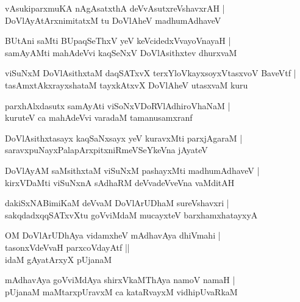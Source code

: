 \documentclass[twoside,12pt,openright]{book}
\newcounter{shloka}[chapter]
\begin{document}
\begin{shloka}%
vAsukiparxmuKA nAgAsatxthA deVvAsutxreVshavxrAH |\\
DoVlAyAtArxnimitatxM tu DoVlAheV madhumAdhaveV 
\end{shloka}

\begin{shloka}%
BUtAni saMti BUpaqSeThxV yeV keVcidedxVvayoVnayaH |\\
samAyAMti mahAdeVvi kaqSeNxV DoVlAsithxtev dhurxvaM 
\end{shloka}

\begin{shloka}%
viSuNxM DoVlAsithxtaM daqSATxvX terxYloVkayxsoyxVtasxvoV BaveVtf |\\
tasAmxtAkxrayxshataM tayxkAtxvX DoVlAheV utasxvaM kuru
\end{shloka}

\begin{shloka}%
parxhAlxdasutx samAyAti viSoNxVDoRVlAdhiroVhaNaM |\\
kuruteV ca mahAdeVvi varadaM tamanusamxranf
\end{shloka}

\begin{shloka}%
DoVlAsithxtasayx kaqSaNxsayx yeV kuravxMti parxjAgaraM |\\
saravxpuNayxPalapArxpitxniRmeVSeYkeVna jAyateV 
\end{shloka}

\begin{shloka}%
DoVlAyAM saMsithxtaM viSuNxM pashayxMti madhumAdhaveV |\\
kirxVDaMti viSuNxnA sAdhaRM deVvadeVveVna vaMditAH 
\end{shloka}

\begin{shloka}%
dakiSxNABimiKaM deVvaM DoVlArUDhaM sureVshavxri |\\
sakqdadxqqSATxvXtu goVviMdaM mucayxteV barxhamxhatayxyA 
\end{shloka}

\begin{shloka}%
OM DoVlArUDhAya vidamxheV mAdhavAya dhiVmahi |\\
tasonxVdeVvaH parxcoVdayAtf ||\\
idaM gAyatArxyX pUjanaM
\end{shloka}

\begin{shloka}%
mAdhavAya goVviMdAya shirxVkaMThAya namoV namaH |\\
pUjanaM maMtarxpUravxM ca kataRvayxM vidhipUvaRkaM 
\end{shloka}
\end{document}
